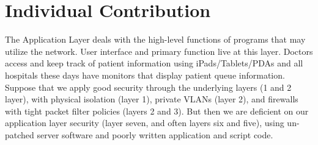 \documentclass[letterpaper, 10 pt, conference]{ieeeconf}  %
\begin{document}
\section{Individual Contribution}
The Application Layer deals with the high-level functions of programs that may utilize the network. User interface and primary function live at this layer. Doctors access and keep track of patient information using iPads/Tablets/PDAs and all hospitals these days have monitors that display patient queue information.\\
Suppose that we apply good security through the underlying layers (1 and 2 layer), with physical isolation (layer 1), private VLANs (layer 2), and firewalls with tight packet filter policies (layers 2 and 3). But then we are deficient on our application layer security (layer seven, and often layers six and five), using un-patched server software and poorly written application and script code.
\end{document}
